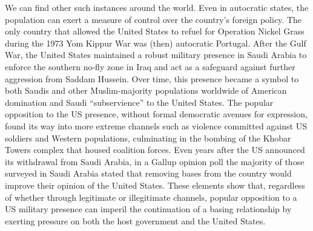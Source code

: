 We can find other such instances around the world. Even in autocratic states, the population can exert a measure of control over the country's foreign policy. The only country that allowed the United States to refuel for Operation Nickel Grass during the 1973 Yom Kippur War was (then) autocratic Portugal.\autocite{sandars2000}  After the Gulf War, the United States maintained a robust military presence in Saudi Arabia to enforce the southern no-fly zone in Iraq and act as a safeguard against further aggression from Saddam Hussein. Over time, this presence became a symbol to both Saudis and other Muslim-majority populations worldwide of American domination and Saudi ``subservience'' to the United States.\autocite{BBC2003} The popular opposition to the US presence, without formal democratic avenues for expression, found its way into more extreme channels such as violence committed against US soldiers and Western populations, culminating in the bombing of the Khobar Towers complex that housed coalition forces.\autocite[While the attack on Khobar Towers was later attributed to Iran and Hezbollah, there are still conflicting accounts that attribute it to Al Qaeda. Critical here is that the attack was attributed to Saudi militants at the time of the attack. The political considerations surrounding the sensitivity and safety of the US presence and public support in Saudi Arabia itself became a severe issue for debate following the attack.][]{NYT1996a, NYT1996b} Even years after the US announced its withdrawal from Saudi Arabia, in a Gallup opinion poll the majority of those surveyed in Saudi Arabia stated that removing bases from the country would improve their opinion of the United States.\autocite{GallupSA2009} These elements show that, regardless of whether through legitimate or illegitimate channels, popular opposition to a US military presence can imperil the continuation of a basing relationship by exerting pressure on both the host government and the United States.

